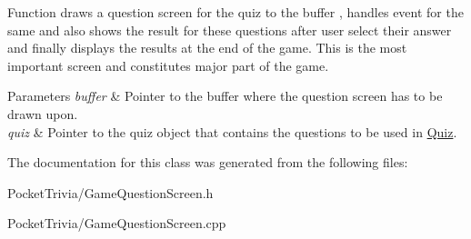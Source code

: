 Function draws a question screen for the quiz to the buffer , handles event for the same and also shows the result for these questions after user select their answer and finally displays the results at the end of the game. This is the most important screen and constitutes major part of the game. 


\begin{DoxyParams}{Parameters}
{\em buffer} & Pointer to the buffer where the question screen has to be drawn upon. \\
\hline
{\em quiz} & Pointer to the quiz object that contains the questions to be used in \mbox{\hyperlink{class_quiz}{Quiz}}. \\
\hline
\end{DoxyParams}


The documentation for this class was generated from the following files\+:\begin{DoxyCompactItemize}
\item 
Pocket\+Trivia/Game\+Question\+Screen.\+h\item 
Pocket\+Trivia/Game\+Question\+Screen.\+cpp\end{DoxyCompactItemize}
